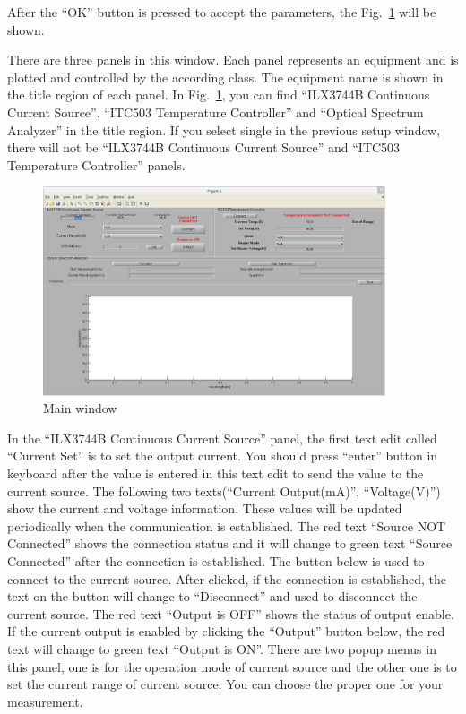 \documentclass[a4paper,12pt]{article}
\begin{document}
After the ``OK'' button is pressed to accept the parameters, the
Fig.~\ref{fig:main_window} will be shown.

There are three panels in this window. Each panel represents an equipment and is
plotted and controlled by the according class. The equipment name is shown in
the title region of each panel. In Fig.~\ref{fig:main_window}, you can find
``ILX3744B Continuous Current Source'', ``ITC503 Temperature Controller'' and
``Optical Spectrum Analyzer'' in the title region. If you select single in the
previous setup window, there will not be ``ILX3744B Continuous Current Source''
and ``ITC503 Temperature Controller'' panels.

\begin{figure}[htbp]
	\centering
	\includegraphics[width=0.9\textwidth]{./figs/main_window.eps}
	\caption{Main window}
	\label{fig:main_window}
\end{figure}

In the ``ILX3744B Continuous Current Source'' panel, the first text edit called
``Current Set'' is to set the output current. You should press ``enter'' button in
keyboard after the value is entered in this text edit to send the value to the
current source. The following two texts(``Current Output(mA)'', ``Voltage(V)'') show
the current and voltage information. These values will be updated periodically
when the communication is established. The red text ``Source NOT Connected'' shows
the connection status and it will change to green text ``Source Connected'' after
the connection is established. The button below is used to connect to the
current source. After clicked, if the connection is established, the text on the
button will change to ``Disconnect'' and used to disconnect the current source.
The red text ``Output is OFF'' shows the status of output enable. If the current
output is enabled by clicking the ``Output'' button below, the red text will
change to green text ``Output is ON''. There are two popup menus in this panel,
one is for the operation mode of current source and the other one is to set the
current range of current source. You can choose the proper one for your
measurement.
\end{document}
